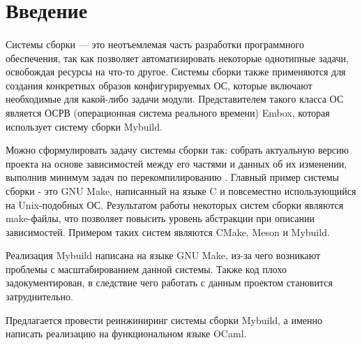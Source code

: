
\section*{Введение}
\thispagestyle{withCompileDate}

\paragraph{} Системы сборки --- это неотъемлемая часть разработки программного обеспечения, так как позволяет автоматизировать некоторые однотипные задачи, освобождая ресурсы на что-то другое. Системы сборки также применяются для создания конкретных образов конфигурируемых ОС, которые включают необходимые для какой-либо задачи модули. Представителем такого класса ОС является ОСРВ (операционная система реального времени) Embox, которая использует систему сборки Mybuild.

Можно сформулировать задачу системы сборки так: собрать актуальную версию проекта на основе зависимостей между его частями и данных об их изменении, выполнив минимум задач по перекомпилированию \cite{mokhov2018build}. Главный пример системы сборки - это GNU Make, написанный на языке C и повсеместно использующийся на Unix-подобных ОС. Результатом работы некоторых систем сборки являются make-файлы, что позволяет повысить уровень абстракции при описании зависимостей. Примером таких систем являются CMake, Meson и Mybuild.

Реализация Mybuild написана на языке GNU Make, из-за чего возникают проблемы с масштабированием данной системы. Также код плохо задокументирован, в следствие чего работать с данным проектом становится затруднительно.

Предлагается провести реинжиниринг системы сборки Mybuild, а именно написать реализацию на функциональном языке OCaml.

